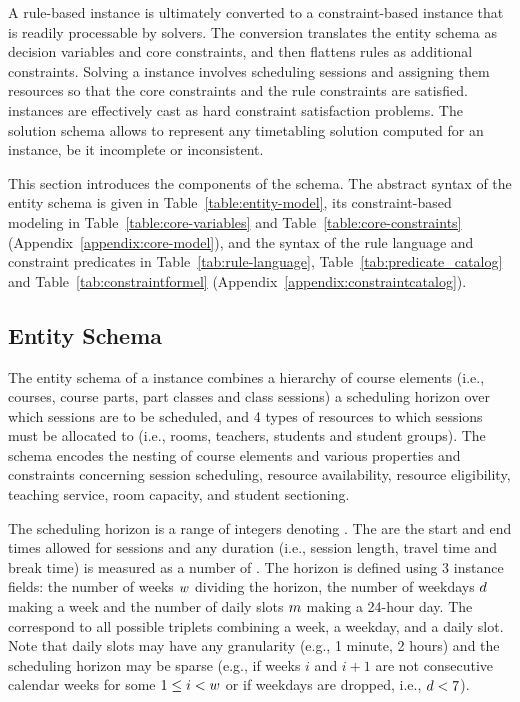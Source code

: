 \documentclass[runningheads]{llncs}
\begin{document}
A rule-based \UTP{} instance is ultimately 
converted
to a constraint-based instance
that is readily processable by solvers.
The conversion 
translates the entity schema as decision variables and core constraints, and then flattens rules as additional constraints.
Solving a \UTP{} instance involves scheduling sessions
and assigning them resources 
so that the core constraints and the rule constraints are satisfied.
\UTP{} instances are effectively cast as hard constraint satisfaction problems. The solution schema allows to represent
any timetabling solution computed for an instance,
be it incomplete or inconsistent.

This section introduces
the components of the schema.
The abstract syntax of the entity schema
is given in Table~\ref{table:entity-model},
its constraint-based modeling in
Table~\ref{table:core-variables} and
Table~\ref{table:core-constraints}
(Appendix~\ref{appendix:core-model}),
and the syntax of the rule language
and constraint predicates in
Table~\ref{tab:rule-language},
Table~\ref{tab:predicate_catalog} and
Table~\ref{tab:constraintformel}
(Appendix~\ref{appendix:constraintcatalog}).


\subsection{Entity Schema}
\label{sec:entity-schema}



The entity schema 
of a \UTP{} instance
combines
a hierarchy of course elements (i.e., courses, course parts, part classes and class sessions)
a scheduling horizon over which sessions are to be scheduled,
and 4 types of resources to which sessions must be allocated to
(i.e., rooms, teachers, students and student groups).
The schema encodes the nesting of course elements
and various properties and constraints 
concerning 
session scheduling,
resource availability, 
resource eligibility,
teaching service,
room capacity,
and student sectioning. 

The scheduling horizon is a range
of integers denoting \timepoints{}.
The \timepoints{} are the start and end times allowed for sessions
and any duration (i.e., session length, travel time and break time)
is measured as a number of \timepoints{}. 
The horizon is
defined using 3 instance fields: 
the number of weeks $w$ dividing the horizon, 
the number of weekdays $d$ making a week 
and the number of daily slots $m$ making a 24-hour day.
The \timepoints{} correspond to all possible triplets combining a week, a weekday, and a daily slot. 
Note that daily slots may have any granularity (e.g., 1 minute, 2 hours)
and
the scheduling horizon may be sparse
(e.g., if weeks $i$ and $i+1$ are not consecutive calendar weeks for some $1\leq i<w$ 
or if weekdays are dropped, i.e., $d<7$).
\end{document}
